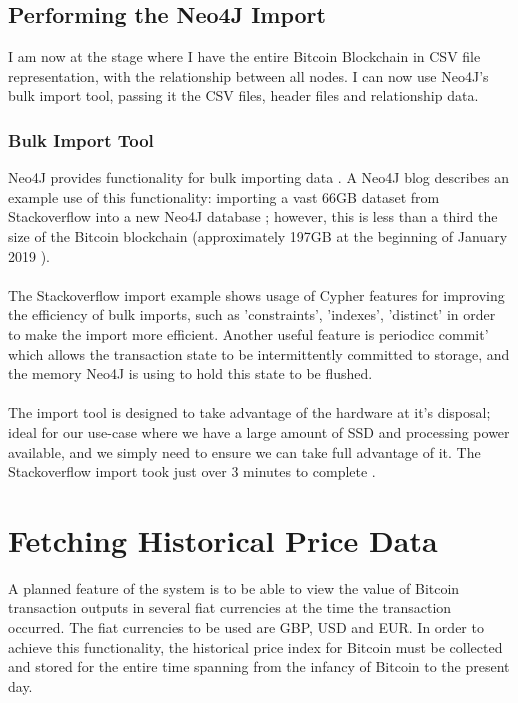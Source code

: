 \subsection{Performing the Neo4J Import}
I am now at the stage where I have the entire Bitcoin Blockchain in CSV file representation, with the relationship between all nodes. I can now use Neo4J's bulk import tool, passing it the CSV files, header files and relationship data. 

\subsubsection{Bulk Import Tool}
Neo4J provides functionality for bulk importing data \cite{RefWorks:doc:5c6ab610e4b02c4a19ae3ed1}. A Neo4J blog describes an example use of this functionality: importing a  vast 66GB dataset from Stackoverflow into a new Neo4J database \cite{RefWorks:doc:5c6ab2bae4b08c9b85da964f}; however, this is less than a third the size of the Bitcoin blockchain (approximately 197GB at the beginning of January 2019 \cite{RefWorks:doc:5c6ab1a3e4b05e3aaec0ffc8}).
\\\\ 
The Stackoverflow import example shows usage of Cypher features for improving the efficiency of bulk imports, such as 'constraints', 'indexes', 'distinct'  in order to make the import more efficient. Another useful feature is periodicc commit' which allows the transaction state to be intermittently committed to storage, and the memory Neo4J is using to hold this state to be flushed. 
\\\\
The import tool is designed to take advantage of the hardware at it's disposal; ideal for our use-case where we have a large amount of SSD and processing power available, and we simply need to ensure we can take full advantage of it. The Stackoverflow import took just over 3 minutes to complete \cite{RefWorks:doc:5c6ab2bae4b08c9b85da964f}. 

\section{Fetching Historical Price Data}
A planned feature of the system is to be able to view the value of Bitcoin transaction outputs in several fiat currencies at the time the transaction occurred. The fiat currencies to be used are GBP, USD and EUR. In order to achieve this functionality, the historical price index for Bitcoin must be collected and stored for the entire time spanning from the infancy of Bitcoin to the present day. 

